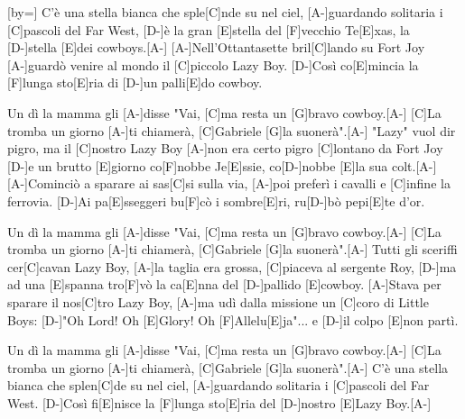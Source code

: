[by={}]
\beginverse 
[A-]C'è una stella bianca che sple[C]nde su nel ciel,
[A-]guardando solitaria i [C]pascoli del Far West,
[D-]è la gran [E]stella del [F]vecchio Te[E]xas, la [D-]stella [E]dei cowboys.[A-]
[A-]Nell'Ottantasette bril[C]lando su Fort Joy
[A-]guardò venire al mondo il [C]piccolo Lazy Boy.
[D-]Così co[E]mincia la [F]lunga sto[E]ria di [D-]un palli[E]do cowboy. 
\endverse 

\beginchorus  
[C]Un dì la mamma gli [A-]disse "Vai,
[C]ma resta un [G]bravo cowboy.[A-]
[C]La tromba un giorno [A-]ti chiamerà,
[C]Gabriele [G]la suonerà".[A-]
\endchorus
\beginverse 
[A-]"Lazy" vuol dir pigro, ma il [C]nostro Lazy Boy
[A-]non era certo pigro [C]lontano da Fort Joy
[D-]e un brutto [E]giorno co[F]nobbe Je[E]ssie, co[D-]nobbe [E]la sua colt.[A-]
[A-]Cominciò a sparare ai sas[C]si sulla via,
[A-]poi preferì i cavalli e [C]infine la ferrovia.
[D-]Ai pa[E]sseggeri bu[F]cò i sombre[E]ri, ru[D-]bò pepi[E]te d'or. 
\endverse 

\beginchorus  
[C]Un dì la mamma gli [A-]disse "Vai,
[C]ma resta un [G]bravo cowboy.[A-]
[C]La tromba un giorno [A-]ti chiamerà,
[C]Gabriele [G]la suonerà".[A-]
\endchorus
\beginverse 
[A-]Tutti gli sceriffi cer[C]cavan Lazy Boy,
[A-]la taglia era grossa, [C]piaceva al sergente Roy,
[D-]ma ad una [E]spanna tro[F]vò la ca[E]nna del [D-]pallido [E]cowboy.
[A-]Stava per sparare il nos[C]tro Lazy Boy,
[A-]ma udì dalla missione un [C]coro di Little Boys:
[D-]"Oh Lord! Oh [E]Glory! Oh [F]Allelu[E]ja"... e [D-]il colpo [E]non partì. 
\endverse 

\beginchorus  
[C]Un dì la mamma gli [A-]disse "Vai,
[C]ma resta un [G]bravo cowboy.[A-]
[C]La tromba un giorno [A-]ti chiamerà,
[C]Gabriele [G]la suonerà".[A-]
\endchorus
\beginverse 
[A-]C'è una stella bianca che splen[C]de su nel ciel,
[A-]guardando solitaria i [C]pascoli del Far West.
[D-]Così fi[E]nisce la [F]lunga sto[E]ria del [D-]nostro [E]Lazy Boy.[A-]
\endverse 
\endsong 

